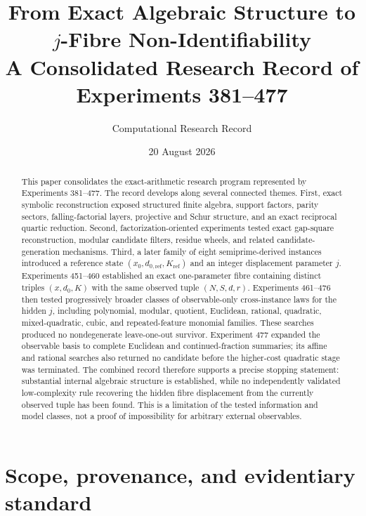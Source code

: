 \documentclass[11pt,a4paper]{article}
\title{\textbf{From Exact Algebraic Structure to $j$-Fibre Non-Identifiability}\\
\large A Consolidated Research Record of Experiments 381--477}
\author{Computational Research Record}
\date{20 August 2026}
\begin{document}
\maketitle

\begin{abstract}
This paper consolidates the exact-arithmetic research program represented by Experiments 381--477. The record develops along several connected themes. First, exact symbolic reconstruction exposed structured finite algebra, support factors, parity sectors, falling-factorial layers, projective and Schur structure, and an exact reciprocal quartic reduction. Second, factorization-oriented experiments tested exact gap-square reconstruction, modular candidate filters, residue wheels, and related candidate-generation mechanisms. Third, a later family of eight semiprime-derived instances introduced a reference state $(x_0,d_{0,\mathrm{ref}},K_{\mathrm{ref}})$ and an integer displacement parameter $j$. Experiments 451--460 established an exact one-parameter fibre containing distinct triples $(x,d_0,K)$ with the same observed tuple $(N,S,d,r)$. Experiments 461--476 then tested progressively broader classes of observable-only cross-instance laws for the hidden $j$, including polynomial, modular, quotient, Euclidean, rational, quadratic, mixed-quadratic, cubic, and repeated-feature monomial families. These searches produced no nondegenerate leave-one-out survivor. Experiment 477 expanded the observable basis to complete Euclidean and continued-fraction summaries; its affine and rational searches also returned no candidate before the higher-cost quadratic stage was terminated. The combined record therefore supports a precise stopping statement: substantial internal algebraic structure is established, while no independently validated low-complexity rule recovering the hidden fibre displacement from the currently observed tuple has been found. This is a limitation of the tested information and model classes, not a proof of impossibility for arbitrary external observables.
\end{abstract}

\tableofcontents
\newpage

\section{Scope, provenance, and evidentiary standard}
\end{document}
